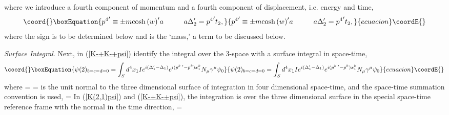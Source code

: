 \documentclass[a4paper,12pt]{article}
\begin{document}
where we introduce a fourth component of momentum and a fourth component of displacement, i.e. energy and time,
\begin{equation}\coord{}\boxEquation{	\label{p4t}
{p^{4}}^{\prime} \equiv \pm m {\cosh{(w)}}^{\prime} a   \hspace{1cm}  a \Delta_{2}^{\prime} = {p^{4}}^{\prime} t_{2} , 
}{	{p^{4}}^{\prime} \equiv \pm m {\cosh{(w)}}^{\prime} a   \hspace{1cm}  a \Delta_{2}^{\prime} = {p^{4}}^{\prime} t_{2} , 
}{ecuacion}\coordE{}\end{equation}
where the sign is to be determined below and \coordHE{} is the `mass,' a term to be discussed below.

	{\textit{Surface Integral}}. Next, in (\ref{K-+K-+psi}) identify the integral over the 3-space \coordHE{} with a surface integral in space-time,
\begin{equation}\coord{}\boxEquation{	\label{K-+K-+psi1}
\psi(2)_{b=c=d=0} = \int_{S} d^4 x_{1}I e^{ i (\Delta_{1}^{\prime}- \Delta_{1})} e^{i (p^{k \; \prime} - p^{k})x_{1}^{k}} N_{\mu} \gamma^{\mu} \psi_{0}
}{	\psi(2)_{b=c=d=0} = \int_{S} d^4 x_{1}I e^{ i (\Delta_{1}^{\prime}- \Delta_{1})} e^{i (p^{k \; \prime} - p^{k})x_{1}^{k}} N_{\mu} \gamma^{\mu} \psi_{0}
}{ecuacion}\coordE{}\end{equation}
where \coordHE{} = \coordHE{}  \myHighlight{$\mu \in$}\coordHE{}  \coordHE{}  \coordHE{} = \coordHE{} is the unit normal to the three dimensional surface of integration \coordHE{} in four dimensional space-time, and the space-time summation convention is used, \coordHE{} = \coordHE{} In (\ref{K(2,1)psi}) and (\ref{K-+K-+psi}), the integration is over the three dimensional surface \coordHE{} in the special space-time reference frame with the normal in the time direction,  \coordHE{} = \coordHE{} 
 
\end{document}
